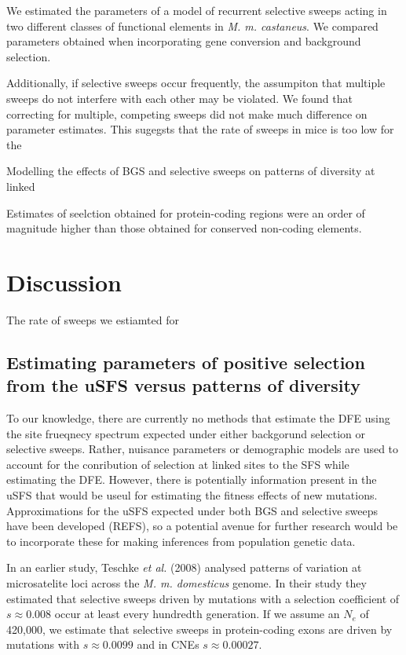 \documentclass[11pt]{article}
\begin{document}
	We estimated the parameters of a model of recurrent selective sweeps acting in two different classes of functional elements in \textit{M. m. castaneus}. We compared parameters obtained when incorporating gene conversion and background selection.
	
	Additionally, if selective sweeps occur frequently, the assumpiton that multiple sweeps do not interfere with each other may be violated. We found that correcting for multiple, competing sweeps did not make much difference on parameter estimates. This sugegsts that the rate of sweeps in mice is too low for the 

Modelling the effects of BGS and selective sweeps on patterns of diversity at linked 


Estimates of seelction obtained for protein-coding regions were an order of magnitude higher than those obtained for conserved non-coding elements. 




\section*{Discussion}

The rate of sweeps we estiamted for 

\subsection*{Estimating parameters of positive selection from the uSFS versus patterns of diversity}

To our knowledge, there are currently no methods that estimate the DFE using the site frueqnecy spectrum expected under either backgorund selection or selective sweeps. Rather, nuisance parameters or demographic models are used to account for the conribution of selection at linked sites to the SFS while estimating the DFE. However, there is potentially information present in the uSFS that would be useul for estimating the fitness effects of new mutations. Approximations for the uSFS expected under both BGS and selective sweeps have been developed (REFS), so a potential avenue for further research would be to incorporate these for making inferences from population genetic data.

In an earlier study, Teschke \textit{et al.} (2008) analysed patterns of variation at microsatelite loci across the \textit{M. m. domesticus} genome. In their study they estimated that selective sweeps driven by mutations with a selection coefficient of $s \approx 0.008$ occur at least every hundredth generation. If we assume an $N_e$ of 420,000, we estimate that selective sweeps in protein-coding exons are driven by mutations with $s \approx 0.0099$ and in CNEs $s \approx 0.00027$. 
\end{document}
